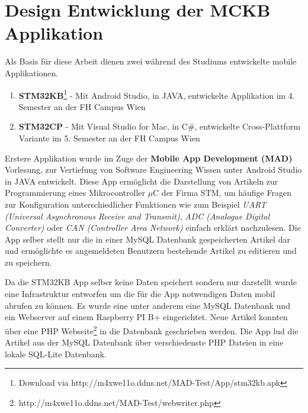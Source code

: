 %
%
% 
% 


\chapter{Design Entwicklung der MCKB Applikation}
\label{chap:xamarinformsdevelopment}

	Als Basis für diese Arbeit dienen zwei während des Studiums entwickelte mobile Applikationen.
	\begin{enumerate}
		\setlength\itemsep{0em}
		\item \textbf{STM32KB}\footnote{Download via http://m4xwe11o.ddns.net/MAD-Test/App/stm32kb.apk} - Mit Android Studio, in JAVA, entwickelte Applikation im 4. Semester an der FH Campus Wien
		\item \textbf{STM32CP} - Mit Visual Studio for Mac, in C\#, entwickelte Cross-Plattform Variante im 5. Semester an der FH Campus Wien
	\end{enumerate}
	Erstere Applikation wurde im Zuge der \textbf{Mobile App Development (MAD)} Vorlesung, zur Vertiefung von Software Engineering Wissen unter Android Studio in JAVA entwickelt. Diese App ermöglicht die Darstellung von Artikeln zur Programmierung eines Mikrocontroller $\mu$C der Firma STM, um häufige Fragen zur Konfiguration unterschiedlicher Funktionen wie zum Beispiel \textit{UART (Universal Asynchronous Receive and Transmit)}, \textit{ADC (Analogue Digital Converter)} oder \textit{CAN (Controller Area Network)} einfach erklärt nachzulesen. Die App selber stellt nur die in einer MySQL Datenbank gespeicherten Artikel dar und ermöglichte es angemeldeten Benutzern bestehende Artikel zu editieren und zu speichern.

	Da die STM32KB App selber keine Daten speichert sondern nur darstellt wurde eine Infrastruktur entworfen um die für die App notwendigen Daten mobil abrufen zu können. Es wurde eine unter anderem eine MySQL Datenbank und ein Webserver auf einem Raspberry PI B+ eingerichtet. Neue Artikel konnten über eine PHP Webseite\footnote{http://m4xwe11o.ddns.net/MAD-Test/webwriter.php} in die Datenbank geschrieben werden. Die App lud die Artikel aus der MySQL Datenbank über verschiedenste PHP Dateien in eine lokale SQL-Lite Datenbank.


